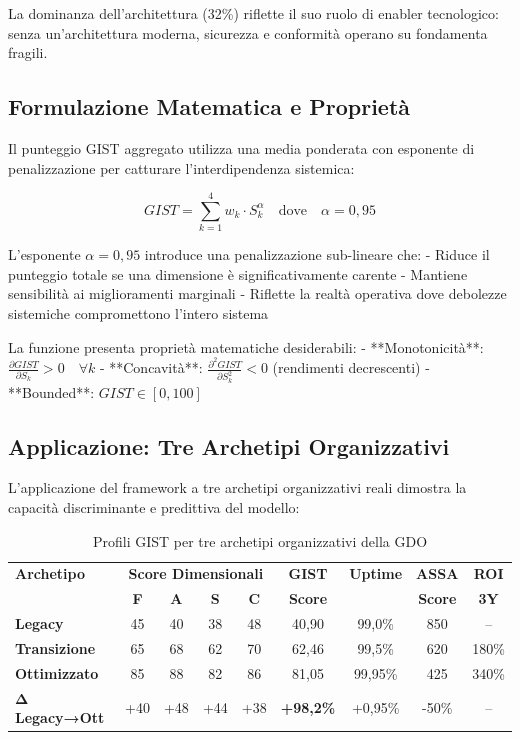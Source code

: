 La dominanza dell'architettura (32\%) riflette il suo ruolo di enabler tecnologico: senza un'architettura moderna, sicurezza e conformità operano su fondamenta fragili.

\subsection{\texorpdfstring{Formulazione Matematica e Proprietà}{5.3.2 - Formulazione Matematica}}
\label{subsec:5.3.2}

Il punteggio GIST aggregato utilizza una media ponderata con esponente di penalizzazione per catturare l'interdipendenza sistemica:

\begin{equation}
\boxed{GIST = \sum_{k=1}^{4} w_k \cdot S_k^{\alpha} \quad \text{dove} \quad \alpha = 0,95}
\end{equation}

L'esponente $\alpha = 0,95$ introduce una penalizzazione sub-lineare che:
- Riduce il punteggio totale se una dimensione è significativamente carente
- Mantiene sensibilità ai miglioramenti marginali
- Riflette la realtà operativa dove debolezze sistemiche compromettono l'intero sistema

La funzione presenta proprietà matematiche desiderabili:
- **Monotonicità**: $\frac{\partial GIST}{\partial S_k} > 0 \quad \forall k$
- **Concavità**: $\frac{\partial^2 GIST}{\partial S_k^2} < 0$ (rendimenti decrescenti)
- **Bounded**: $GIST \in [0, 100]$

\subsection{\texorpdfstring{Applicazione: Tre Archetipi Organizzativi}{5.3.3 - Tre Archetipi}}
\label{subsec:5.3.3}

L'applicazione del framework a tre archetipi organizzativi reali dimostra la capacità discriminante e predittiva del modello:

\begin{table}[htbp]
\centering
\caption{Profili GIST per tre archetipi organizzativi della GDO}
\label{tab:gist_archetypes}
\begin{tabular}{@{}lcccccccc@{}}
\toprule
\textbf{Archetipo} & \multicolumn{4}{c}{\textbf{Score Dimensionali}} & \textbf{GIST} & \textbf{Uptime} & \textbf{ASSA} & \textbf{ROI} \\
& \textbf{F} & \textbf{A} & \textbf{S} & \textbf{C} & \textbf{Score} & & \textbf{Score} & \textbf{3Y} \\
\midrule
\textbf{Legacy} & 45 & 40 & 38 & 48 & 40,90 & 99,0\% & 850 & -- \\
\textbf{Transizione} & 65 & 68 & 62 & 70 & 62,46 & 99,5\% & 620 & 180\% \\
\textbf{Ottimizzato} & 85 & 88 & 82 & 86 & 81,05 & 99,95\% & 425 & 340\% \\
\midrule
\textbf{Δ Legacy→Ott} & +40 & +48 & +44 & +38 & \textbf{+98,2\%} & +0,95\% & -50\% & -- \\
\bottomrule
\end{tabular}
\end{table}

